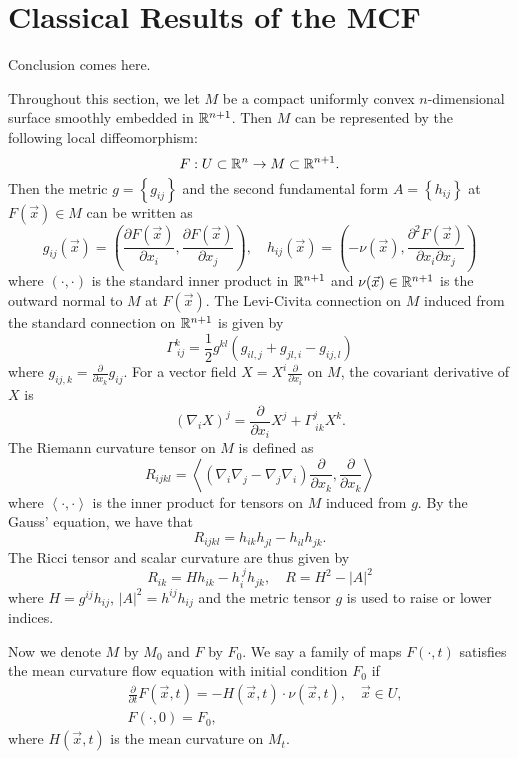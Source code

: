 %

\chapter{Classical Results of the MCF}

{
Conclusion comes here.
}

Throughout this section, we let $M$ be a compact uniformly convex $n$-dimensional surface smoothly embedded in $\mathbb{R}^{n+1}$. Then $M$ can be represented by the following local diffeomorphism:
\[
	F: U \subset \mathbb{R}^n \rightarrow M \subset \mathbb{R}^{n+1}.
\]
Then the metric $g= \left\{ g_{ij} \right\}  $ and the second fundamental form $A= \left\{ h_{ij} \right\}  $ at $F(\vec{x}) \in M$ can be written as
\[
	g_{ij}(\vec{x})=\left( \frac{\partial F(\vec{x})}{\partial x_i}, \frac{\partial F(\vec{x})}{\partial x_j} \right) ,\quad h_{ij}(\vec{x})=\left( -\nu (\vec{x}), \frac{\partial^2 F(\vec{x})}{\partial x_i \partial x_j} \right)
\]
where $\left( \cdot , \cdot \right) $ is the standard inner product in $\mathbb{R}^{n+1}$ and $\nu (\vec{x}) \in \mathbb{R}^{n+1}$ is the outward normal to $M$ at $F(\vec{x})$. The Levi-Civita connection on $M$ induced from the standard connection on $\mathbb{R}^{n+1}$ is given by 
\[\Gamma_{\ ij}^{k} =\frac{1}{2}g_{ }^{kl} \left( g_{ il,j}^{} +g_{ jl,i}^{} - g_{ij ,l}^{}  \right) \]
where $g_{ij ,k}=\frac{\partial }{\partial x_{k}} g_{ij}$. For a vector field $X=X^i \frac{\partial }{\partial x_{i}} $ on $M$, the covariant derivative of $X$ is \[\left( \nabla_{i}^{} X \right) ^j=\frac{\partial }{\partial x_{i}} X^j + \Gamma_{\ ik}^{j} X^k.\]
The Riemann curvature tensor on $M$ is defined as 
\[R_{ijkl}= \left< (\nabla_{i}^{} \nabla_{j}^{} -\nabla_{j}^{} \nabla_{i}^{}) \frac{\partial }{\partial x_{k}} , \frac{\partial }{\partial x_{k}}  \right> \] where $\left\langle  \cdot , \cdot \right\rangle $ is the inner product for tensors on $M$ induced from $g$. By the Gauss' equation, we have that \[R_{ijkl}=h_{ik}h_{jl }^{}-h_{ il}^{} h_{ jk}^{} . \] The Ricci tensor and scalar curvature are thus given by
\[R_{ik}=Hh_{ik}-h_{ i}^{\ j} h_{ jk}^{} , \quad R=H^2-\left| A \right| ^2\]
where $H=g^{ij}h_{ij}$, $\left| A \right| ^2=h^{ij}h_{ij}$ and the metric tensor $g$ is used to raise or lower indices.

Now we denote $M$ by $M_0$ and $F$ by $F_0$. We say a family of maps $F(\cdot , t)$ satisfies the mean curvature flow equation with initial condition $F_0$ if
\begin{align*}
	 & \frac{\partial }{\partial t} F(\vec{x},t)=-H(\vec{x},t) \cdot \nu (\vec{x},t), \quad \vec{x} \in U, \\
	 & F(\cdot ,0)=F_0,
\end{align*}
where $H(\vec{x},t)$ is the mean curvature on $M_t$.

